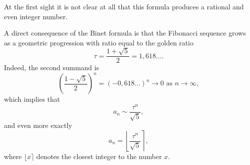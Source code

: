 

\setcounter{section}{1}
\setcounter{subsection}{1}
\setcounter{dfn}{1}


At the first sight it is not clear at all that this formula produces a rational and even integer number.

A direct consequence of the Binet formula is that the Fibonacci sequence grows as a geometric progression with ratio
equal to the golden ratio
\[
\tau = \frac{1+\sqrt{5}}2 = 1,618\ldots.
\]
Indeed, the second summand is
\[
\left(\frac{1-\sqrt{5}}2\right)^n = (-0,618\ldots)^n \to 0 \text{ as } n \to \infty,
\]
which implies that
\[
a_n \sim \frac{\tau^n}{\sqrt{5}},
\]
and even more exactly
\[
a_n = \left\lfloor \frac{\tau^n}{\sqrt{5}} \right\rceil,
\]
where $\lfloor x \rceil$ denotes the closest integer to the number $x$.




